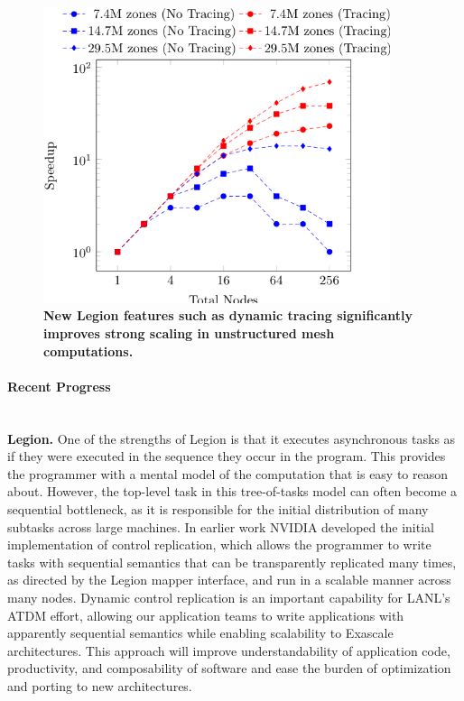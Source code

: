 \begin{figure}[htb]
        \centering
        \includegraphics[width=4in]{projects/2.3.1-PMR/2.3.1.02-LANL-ATDM-PMR/tracing-performance}
        \caption{\label{fig:tracing-performance}\textbf{New Legion features such as dynamic tracing significantly improves strong scaling in unstructured mesh computations.}}
\end{figure}




\paragraph{Recent Progress} \leavevmode \\



\textbf{Legion.} 
One of the strengths of Legion is that it executes asynchronous tasks as if they were executed in the sequence they occur in the program. This provides the programmer with a mental model of the computation that is easy to reason about. However, the top-level task in this tree-of-tasks model can often become a sequential bottleneck, as it is responsible for the initial distribution of many subtasks across large machines. In earlier work NVIDIA developed the initial implementation of control replication, which allows the programmer to write tasks with sequential semantics that can be  transparently replicated many times, as directed by the Legion mapper interface, and run in a scalable manner across many nodes.
Dynamic control replication is an important capability for LANL's ATDM effort, allowing our application teams to write applications with apparently sequential semantics while enabling scalability to Exascale architectures. This approach will improve understandability of application code, productivity, and composability of software and ease the burden of optimization and porting to new architectures. 


